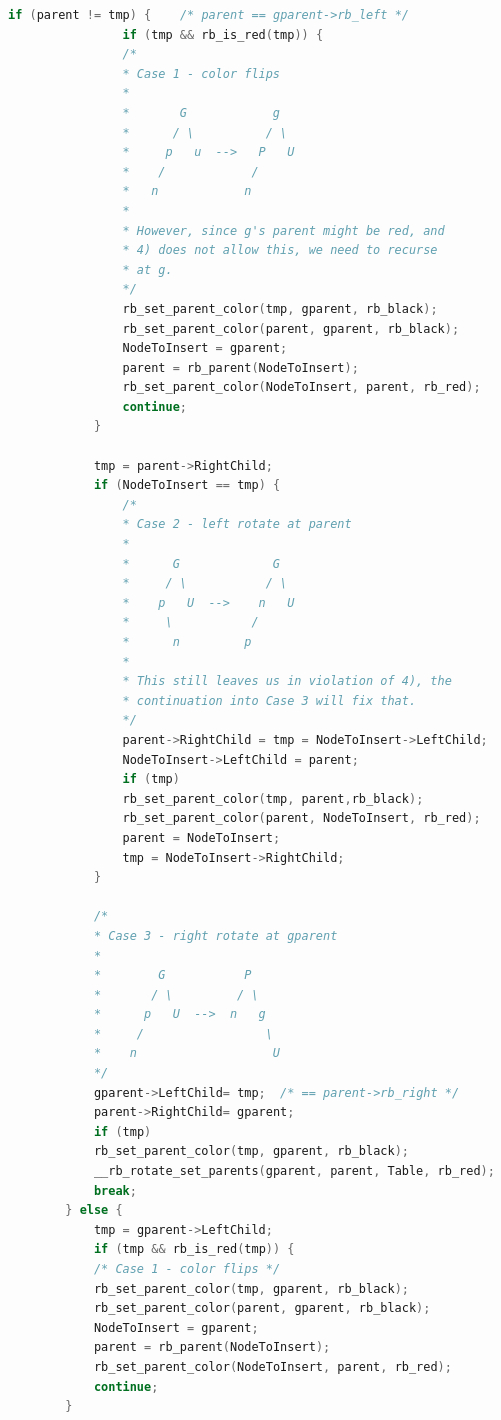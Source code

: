 \begin{lstlisting}[language=C]
            if (parent != tmp) {	/* parent == gparent->rb_left */
                if (tmp && rb_is_red(tmp)) {
                /*
                * Case 1 - color flips
                *
                *       G            g
                *      / \          / \
                *     p   u  -->   P   U
                *    /            /
                *   n            n
                *
                * However, since g's parent might be red, and
                * 4) does not allow this, we need to recurse
                * at g.
                */
                rb_set_parent_color(tmp, gparent, rb_black);
                rb_set_parent_color(parent, gparent, rb_black);
                NodeToInsert = gparent;
                parent = rb_parent(NodeToInsert);
                rb_set_parent_color(NodeToInsert, parent, rb_red);
                continue;
            }

            tmp = parent->RightChild;
            if (NodeToInsert == tmp) {
                /*
                * Case 2 - left rotate at parent
                *
                *      G             G
                *     / \           / \
                *    p   U  -->    n   U
                *     \           /
                *      n         p
                *
                * This still leaves us in violation of 4), the
                * continuation into Case 3 will fix that.
                */
                parent->RightChild = tmp = NodeToInsert->LeftChild;
                NodeToInsert->LeftChild = parent;
                if (tmp)
                rb_set_parent_color(tmp, parent,rb_black);
                rb_set_parent_color(parent, NodeToInsert, rb_red);
                parent = NodeToInsert;
                tmp = NodeToInsert->RightChild;
            }

            /*
            * Case 3 - right rotate at gparent
            *
            *        G           P
            *       / \         / \
            *      p   U  -->  n   g
            *     /                 \
            *    n                   U
            */
            gparent->LeftChild= tmp;  /* == parent->rb_right */
            parent->RightChild= gparent;
            if (tmp)
            rb_set_parent_color(tmp, gparent, rb_black);
            __rb_rotate_set_parents(gparent, parent, Table, rb_red);
            break;
        } else {
            tmp = gparent->LeftChild;
            if (tmp && rb_is_red(tmp)) {
            /* Case 1 - color flips */
            rb_set_parent_color(tmp, gparent, rb_black);
            rb_set_parent_color(parent, gparent, rb_black);
            NodeToInsert = gparent;
            parent = rb_parent(NodeToInsert);
            rb_set_parent_color(NodeToInsert, parent, rb_red);
            continue;
        }


\end{lstlisting}
